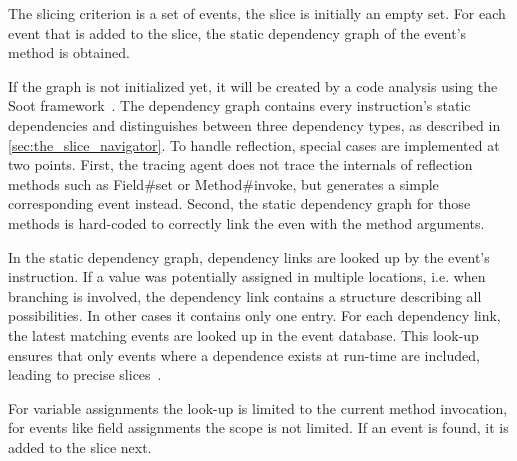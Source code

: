 \documentclass[
			english,
			review,
			]{elsarticle}
\begin{document}


The slicing criterion is a set of events, the slice is initially an empty set.
For each event that is added to the slice, the static dependency graph of the event's method is obtained.

If the graph is not initialized yet, it will be created by a code analysis using the Soot framework~\cite{lam_11_the_soot_framework}.
The dependency graph contains every instruction's static dependencies and distinguishes between three dependency types, as described in \cref{sec:the_slice_navigator}.
To handle reflection, special cases are implemented at two points.
First, the tracing agent does not trace the internals of reflection methods such as Field\#set or Method\#invoke, but generates a simple corresponding event instead.
Second, the static dependency graph for those methods is hard-coded to correctly link the even with the method arguments.


In the static dependency graph, dependency links are looked up by the event's instruction. If a value was potentially assigned in multiple locations, i.e. when branching is involved, the dependency link contains a structure describing all possibilities.
In other cases it contains only one entry.
For each dependency link, the latest matching events are looked up in the event database.
This look-up ensures that only events where a dependence exists at run-time are included, leading to precise slices~\cite{zhang_precise_2003}.

For variable assignments the look-up is limited to the current method invocation, for events like field assignments the scope is not limited.
If an event is found, it is added to the slice next.
\end{document}
